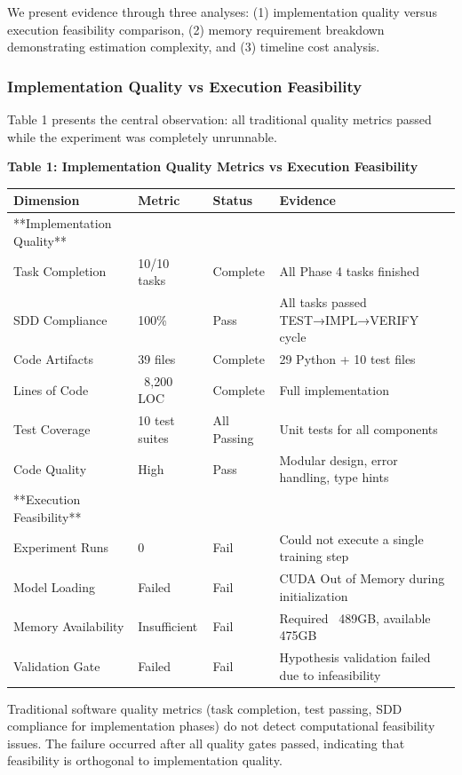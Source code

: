 
We present evidence through three analyses: (1) implementation quality versus execution feasibility comparison, (2) memory requirement breakdown demonstrating estimation complexity, and (3) timeline cost analysis.

\subsubsection{Implementation Quality vs Execution Feasibility}

Table 1 presents the central observation: all traditional quality metrics passed while the experiment was completely unrunnable.

\textbf{Table 1: Implementation Quality Metrics vs Execution Feasibility}

\begin{table}[htbp]
\centering
\begin{tabular}{llll}
\toprule
Dimension & Metric & Status & Evidence \\
\midrule
**Implementation Quality** &  &  &  \\
Task Completion & 10/10 tasks & Complete & All Phase 4 tasks finished \\
SDD Compliance & 100\% & Pass & All tasks passed TEST→IMPL→VERIFY cycle \\
Code Artifacts & 39 files & Complete & 29 Python + 10 test files \\
Lines of Code & ~8,200 LOC & Complete & Full implementation \\
Test Coverage & 10 test suites & All Passing & Unit tests for all components \\
Code Quality & High & Pass & Modular design, error handling, type hints \\
**Execution Feasibility** &  &  &  \\
Experiment Runs & 0 & Fail & Could not execute a single training step \\
Model Loading & Failed & Fail & CUDA Out of Memory during initialization \\
Memory Availability & Insufficient & Fail & Required ~489GB, available 475GB \\
Validation Gate & Failed & Fail & Hypothesis validation failed due to infeasibility \\
\bottomrule
\end{tabular}
\end{table}

Traditional software quality metrics (task completion, test passing, SDD compliance for implementation phases) do not detect computational feasibility issues. The failure occurred after all quality gates passed, indicating that feasibility is orthogonal to implementation quality.

